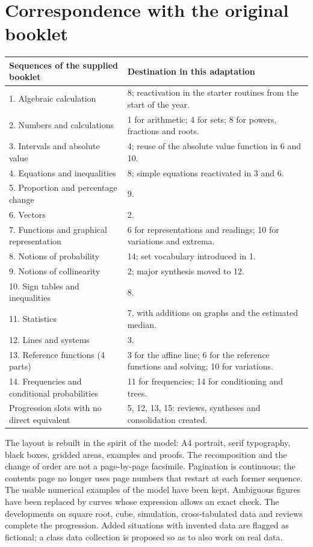 \section*{Correspondence with the original booklet}
\begin{center}\small{}\begin{tabularx}{\linewidth}{p{6.3cm} X}
\textbf{Sequences of the supplied booklet}&\textbf{Destination in this adaptation}\\\hline
1. Algebraic calculation&8; reactivation in the starter routines from the start of the year.\\
2. Numbers and calculations&1 for arithmetic; 4 for sets; 8 for powers, fractions and roots.\\
3. Intervals and absolute value&4; reuse of the absolute value function in 6 and 10.\\
4. Equations and inequalities&8; simple equations reactivated in 3 and 6.\\
5. Proportion and percentage change&9.\\
6. Vectors&2.\\
7. Functions and graphical representation&6 for representations and readings; 10 for variations and extrema.\\
8. Notions of probability&14; set vocabulary introduced in 1.\\
9. Notions of collinearity&2; major synthesis moved to 12.\\
10. Sign tables and inequalities&8.\\
11. Statistics&7, with additions on graphs and the estimated median.\\
12. Lines and systems&3.\\
13. Reference functions (4 parts)&3 for the affine line; 6 for the reference functions and solving; 10 for variations.\\
14. Frequencies and conditional probabilities&11 for frequencies; 14 for conditioning and trees.\\\hline
Progression slots with no direct equivalent&5, 12, 13, 15: reviews, syntheses and consolidation created.
\end{tabularx}\end{center}
The layout is rebuilt in the spirit of the model: A4 portrait, serif typography, black boxes, gridded areas, examples and proofs. The recomposition and the change of order are not a page-by-page facsimile. Pagination is continuous; the contents page no longer uses page numbers that restart at each former sequence.
The usable numerical examples of the model have been kept. Ambiguous figures have been replaced by curves whose expression allows an exact check. The developments on square root, cube, simulation, cross-tabulated data and reviews complete the progression. Added situations with invented data are flagged as fictional; a class data collection is proposed so as to also work on real data.

